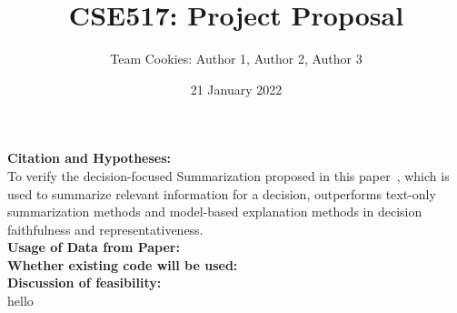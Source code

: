 \documentclass{article}
\title{CSE517: Project Proposal}
\author{Team Cookies: Author 1, Author 2, Author 3}
\date{21 January 2022}
\begin{document}
    \maketitle
    

    \textbf{Citation and Hypotheses:} \\

    To verify the decision-focused Summarization proposed in this paper~\cite{hsu-tan-2021-decision}, which is used to summarize relevant information for a decision,
    outperforms text-only summarization methods and model-based explanation methods in decision faithfulness and representativeness. \\

    \textbf{Usage of Data from Paper:} \\
    \textbf{Whether existing code will be used:} \\
    \textbf{Discussion of feasibility:} \\
    hello

    
\end{document}
